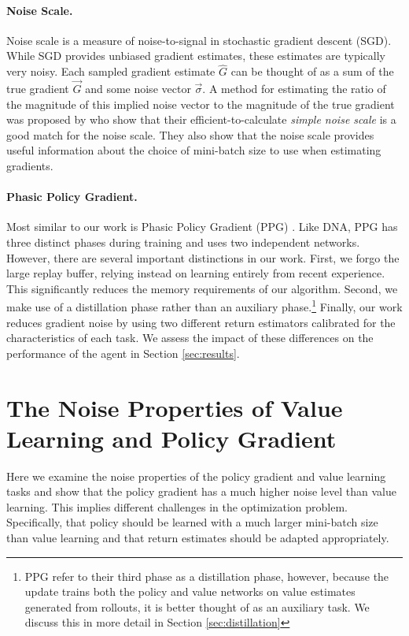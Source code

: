 \documentclass{article}
\begin{document}
\paragraph{Noise Scale.} Noise scale is a measure of noise-to-signal in stochastic gradient descent (SGD). While SGD provides unbiased gradient estimates, these estimates are typically very noisy. Each sampled gradient estimate $\hat{G}$ can be thought of as a sum of the true gradient $\vec{G}$ and some noise vector $\vec{\sigma}$. A method for estimating the ratio of the magnitude of this implied noise vector to the magnitude of the true gradient was proposed by \cite{mccandlish2018empirical} who show that their efficient-to-calculate \textit{simple noise scale} is a good match for the noise scale. They also show that the noise scale provides useful information about the choice of mini-batch size to use when estimating gradients.

\paragraph{Phasic Policy Gradient.} Most similar to our work is Phasic Policy Gradient (PPG) \cite{cobbe2021phasic}. Like DNA, PPG has three distinct phases during training and uses two independent networks. However, there are several important distinctions in our work. First, we forgo the large replay buffer, relying instead on learning entirely from recent experience. This significantly reduces the memory requirements of our algorithm. Second, we make use of a distillation phase rather than an auxiliary phase.\footnote{PPG refer to their third phase as a distillation phase, however, because the update trains both the policy and value networks on value estimates generated from rollouts, it is better thought of as an auxiliary task. We discuss this in more detail in Section \ref{sec:distillation}} Finally, our work reduces gradient noise by using two different return estimators calibrated for the characteristics of each task. We assess the impact of these differences on the performance of the agent in Section \ref{sec:results}.

\section{The Noise Properties of Value Learning and Policy Gradient}
\label{sec:noise}

Here we examine the noise properties of the policy gradient and value learning tasks and show that the policy gradient has a much higher noise level than value learning. This implies different challenges in the optimization problem. Specifically, that policy should be learned with a much larger mini-batch size than value learning and that return estimates should be adapted appropriately.
\end{document}
